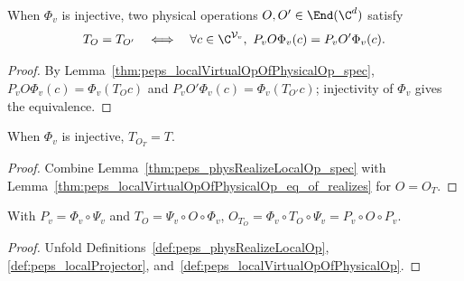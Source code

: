 \begin{lemma}%
    \label{thm:peps_localVirtualOpOfPhysicalOp_eq_of_projected_action_eq}
    \leanok
    When $\Phi_v$ is injective, two physical operations $O,O'\in\End(\C^d)$
    satisfy
    \begin{align}
        T_O=T_{O'}
        \quad\Longleftrightarrow\quad
        \forall c\in\C^{\mathcal V_v},\ P_vO\Phi_v(c)=P_vO'\Phi_v(c).
        \notag
    \end{align}
\end{lemma}
\begin{proof}\leanok
    By Lemma~\ref{thm:peps_localVirtualOpOfPhysicalOp_spec},
    $P_vO\Phi_v(c)=\Phi_v(T_Oc)$ and $P_vO'\Phi_v(c)=\Phi_v(T_{O'}c)$;
    injectivity of $\Phi_v$ gives the equivalence.
\end{proof}

\begin{lemma}%
    \label{thm:peps_localVirtualOpOfPhysicalOp_physRealizeLocalOp}
    \leanok
    When $\Phi_v$ is injective, $T_{O_T}=T$.
\end{lemma}
\begin{proof}\leanok
    Combine Lemma~\ref{thm:peps_physRealizeLocalOp_spec} with
    Lemma~\ref{thm:peps_localVirtualOpOfPhysicalOp_eq_of_realizes} for
    $O=O_T$.
\end{proof}

\begin{lemma}%
    \label{thm:peps_physRealizeLocalOp_localVirtualOpOfPhysicalOp}
    \leanok
    With $P_v=\Phi_v\circ\Psi_v$ and $T_O=\Psi_v\circ O\circ\Phi_v$,
    $O_{T_O}=\Phi_v\circ T_O\circ\Psi_v=P_v\circ O\circ P_v$.
\end{lemma}
\begin{proof}\leanok
    Unfold Definitions~\ref{def:peps_physRealizeLocalOp},
    \ref{def:peps_localProjector}, and~\ref{def:peps_localVirtualOpOfPhysicalOp}.
\end{proof}

